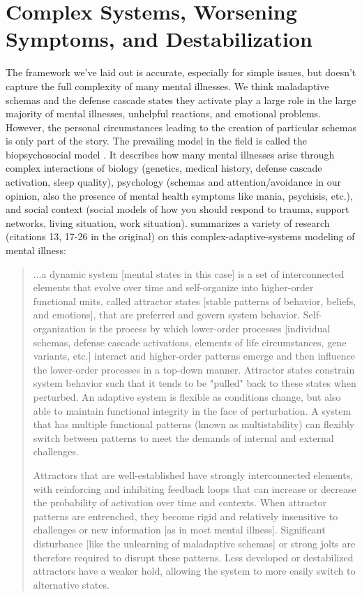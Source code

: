 \documentclass[12pt,letterpaper]{book}
\begin{document}
\section{Complex Systems, Worsening Symptoms, and Destabilization}
\label{sec:complex}
The framework we've laid out is accurate, especially for simple issues, but doesn't capture the full complexity of many mental illnesses. We think maladaptive schemas and the defense cascade states they activate play a large role in the large majority of mental illnesses, unhelpful reactions, and emotional problems. However, the personal circumstances leading to the creation of particular schemas is only part of the story. The prevailing model in the field is called the biopsychosocial model \cite{engel1977need}. It describes how many mental illnesses arise through complex interactions of biology (genetics, medical history, defense cascade activation, sleep quality), psychology (schemas and attention/avoidance in our opinion, also the presence of mental health symptoms like mania, psychisis, etc.), and social context (social models of how you should respond to trauma, support networks, living situation, work situation). \textcite{hayes2020complex} summarizes a variety of research (citations 13, 17-26 in the original) on this complex-adaptive-systems modeling of mental illness:
\begin{quotation}
	...a dynamic system [mental states in this case] is a set of interconnected elements that evolve over time and self-organize into higher-order functional units, called attractor states [stable patterns of behavior, beliefs, and emotions], that are preferred and govern system behavior. Self-organization is the process by which lower-order processes [individual schemas, defense cascade activations, elements of life circumstances, gene variants, etc.] interact and higher-order patterns emerge and then influence the lower-order processes in a top-down manner. Attractor states constrain system behavior such that it tends to be "pulled" back to these states when perturbed. An adaptive system is flexible as conditions change, but also able to maintain functional integrity in the face of perturbation. A system that has multiple functional patterns (known as multistability) can flexibly switch between patterns to meet the demands of internal and external challenges.
	
	Attractors that are well-established have strongly interconnected elements, with reinforcing and inhibiting feedback loops that can increase or decrease the probability of activation over time and contexts. When attractor patterns are entrenched, they become rigid and relatively insensitive to challenges or new information [as in most mental illness]. Significant disturbance [like the unlearning of maladaptive schemas] or strong jolts are therefore required to disrupt these patterns. Less developed or destabilized attractors have a weaker hold, allowing the system to more easily switch to alternative states.
\end{quotation}
\end{document}
